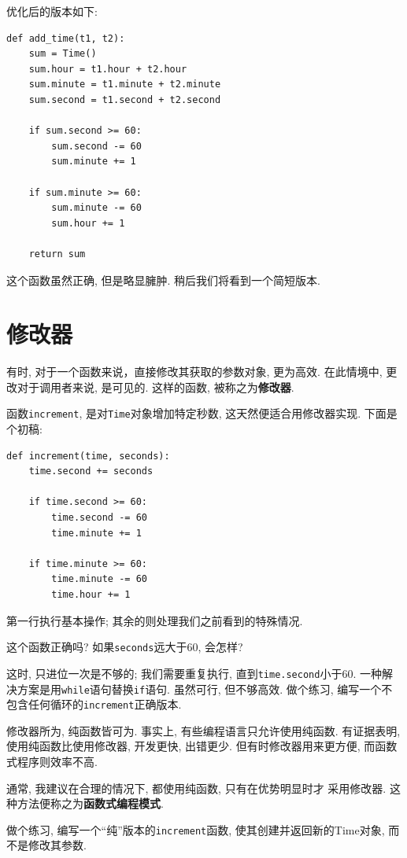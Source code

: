 \documentclass[10pt]{book}
\begin{document}
优化后的版本如下:

\begin{verbatim}
def add_time(t1, t2):
    sum = Time()
    sum.hour = t1.hour + t2.hour
    sum.minute = t1.minute + t2.minute
    sum.second = t1.second + t2.second

    if sum.second >= 60:
        sum.second -= 60
        sum.minute += 1

    if sum.minute >= 60:
        sum.minute -= 60
        sum.hour += 1

    return sum
\end{verbatim}
%
这个函数虽然正确, 但是略显臃肿. 
稍后我们将看到一个简短版本. 


\section{修改器}
\label{increment}

有时, 对于一个函数来说，直接修改其获取的参数对象, 更为高效. 
在此情境中, 更改对于调用者来说, 是可见的. 
这样的函数, 被称之为{\bf 修改器}. 

函数{\tt increment}, 是对{\tt Time}对象增加特定秒数, 
这天然便适合用修改器实现. 
下面是个初稿:

\begin{verbatim}
def increment(time, seconds):
    time.second += seconds

    if time.second >= 60:
        time.second -= 60
        time.minute += 1

    if time.minute >= 60:
        time.minute -= 60
        time.hour += 1
\end{verbatim}
%
第一行执行基本操作;
其余的则处理我们之前看到的特殊情况. 

这个函数正确吗? 如果{\tt seconds}远大于60, 会怎样?

这时, 只进位一次是不够的;
我们需要重复执行, 直到{\tt time.second}小于60.
一种解决方案是用{\tt while}语句替换{\tt if}语句. 
虽然可行, 但不够高效. 
做个练习, 编写一个不包含任何循环的{\tt increment}正确版本. 

修改器所为, 纯函数皆可为. 
事实上, 有些编程语言只允许使用纯函数. 
有证据表明, 使用纯函数比使用修改器, 开发更快, 出错更少. 
但有时修改器用来更方便, 而函数式程序则效率不高. 

通常, 我建议在合理的情况下, 都使用纯函数, 只有在优势明显时才
采用修改器. 这种方法便称之为{\bf 函数式编程模式}. 

做个练习, 编写一个``纯''版本的{\tt increment}函数, 使其创建并返回新的Time对象, 
而不是修改其参数. 
\end{document}
